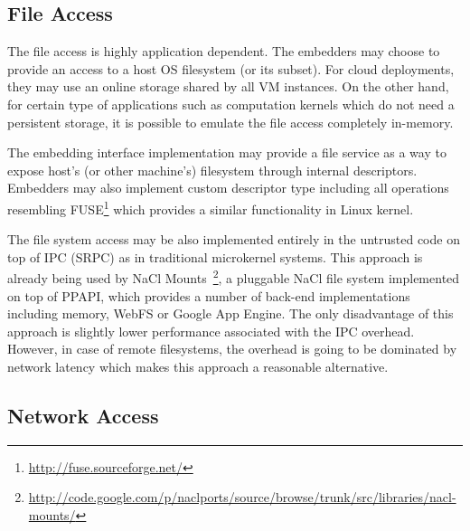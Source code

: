 
\subsection{File Access}
\label{sub:file_access}

The file access is highly application dependent. The embedders may
choose to provide an access to a host OS filesystem (or its subset). 
For cloud deployments, they may use an online storage shared by all VM
instances. On the other hand, for certain type of applications such as
computation kernels which do not need a persistent storage, it is
possible to emulate the file access completely in-memory.

The embedding interface implementation may provide a file service as a
way to expose host's (or other machine's) filesystem through internal
descriptors. Embedders may also implement custom descriptor type
including all operations resembling
FUSE\footnote{\url{http://fuse.sourceforge.net/}} which provides a
similar functionality in Linux kernel.

The file system access may be also implemented entirely in the untrusted
code on top of IPC (\ie SRPC) as in traditional microkernel systems.
This approach is already being used by
NaCl Mounts~\footnote{\url{http://code.google.com/p/naclports/source/browse/trunk/src/libraries/nacl-mounts/}},
a pluggable NaCl file system implemented on top of PPAPI, which provides
a number of back-end implementations including memory, WebFS or Google
App Engine. The only disadvantage of this approach is slightly lower
performance associated with the IPC overhead. However, in case of remote
filesystems, the overhead is going to be dominated by network latency
which makes this approach a reasonable alternative.

\subsection{Network Access}
\label{sub:network_access}

